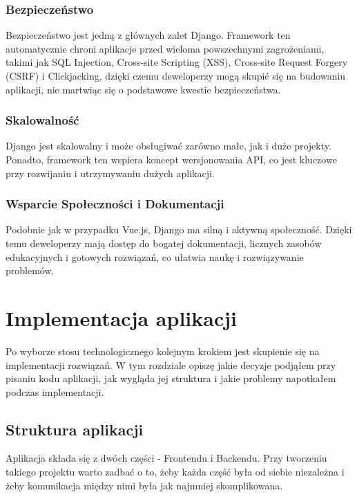 \subsubsection*{Bezpieczeństwo}

Bezpieczeństwo jest jedną z głównych zalet Django. Framework ten automatycznie chroni aplikacje przed wieloma powszechnymi zagrożeniami, takimi jak SQL Injection, Cross-site Scripting (XSS), Cross-site Request Forgery (CSRF) i Clickjacking, dzięki czemu deweloperzy mogą skupić się na budowaniu aplikacji, nie martwiąc się o podstawowe kwestie bezpieczeństwa.

\subsubsection*{Skalowalność}

Django jest skalowalny i może obsługiwać zarówno małe, jak i duże projekty. Ponadto, framework ten wspiera koncept wersjonowania API, co jest kluczowe przy rozwijaniu i utrzymywaniu dużych aplikacji.

\subsubsection*{Wsparcie Społeczności i Dokumentacji}

Podobnie jak w przypadku Vue.js, Django ma silną i aktywną społeczność. Dzięki temu deweloperzy mają dostęp do bogatej dokumentacji, licznych zasobów edukacyjnych i gotowych rozwiązań, co ułatwia naukę i rozwiązywanie problemów.


\section{Implementacja aplikacji}

Po wyborze stosu technologicznego kolejnym krokiem jest skupienie się na implementacji rozwiązań. W tym rozdziale opiszę jakie decyzje podjąłem przy pisaniu kodu aplikacji, jak wygląda jej struktura i jakie problemy napotkałem podczas implementacji.

\subsection*{Struktura aplikacji}

Aplikacja składa się z dwóch części - Frontendu i Backendu. Przy tworzeniu takiego projektu warto zadbać o to, żeby każda część była od siebie niezależna i żeby komunikacja między nimi była jak najmniej skomplikowana.

